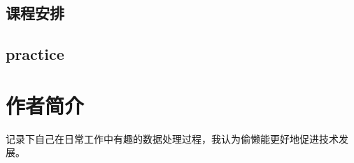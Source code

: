 \documentclass[
]{book}
\begin{document}
\hypertarget{ux8bfeux7a0bux5b89ux6392}{%
\section*{\texorpdfstring{\textbf{课程安排}}{课程安排}}\label{ux8bfeux7a0bux5b89ux6392}}

\hypertarget{practice}{%
\section*{\texorpdfstring{\textbf{practice}}{practice}}\label{practice}}

\hypertarget{author}{%
\chapter*{作者简介}\label{author}}

记录下自己在日常工作中有趣的数据处理过程，我认为偷懒能更好地促进技术发展。

  
\end{document}

